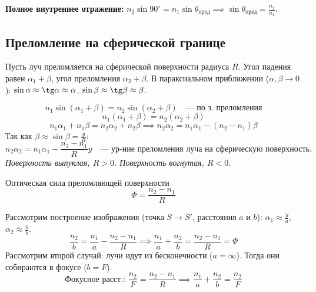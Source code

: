 \textbf{Полное внутреннее отражение:} 
$n_2 \sin 90^\circ = n_1 \sin\theta_{\text{пред}} \implies \sin\theta_{\text{пред}} = \frac{n_2}{n_1}$.

\subsection{Преломление на сферической границе}

Пусть луч преломляется на сферической поверхности радиуса $R$. Угол падения равен $\alpha_1 + \beta$, угол преломления $\alpha_2 + \beta$.
В параксиальном приближении ($\alpha, \beta \to 0$): $\sin\alpha \approx \tg\alpha \approx \alpha$, $\sin\beta \approx \tg\beta \approx \beta$.

\begin{equation*}
	n_1 \sin(\alpha_1 + \beta) = n_2 \sin(\alpha_2 + \beta) \quad \text{--- по з. преломления}
\end{equation*}
\begin{equation*}
	n_1(\alpha_1 + \beta) = n_2(\alpha_2 + \beta)
\end{equation*}
\begin{equation*}
	n_1 \alpha_1 + n_1 \beta = n_2 \alpha_2 + n_2 \beta \implies n_2 \alpha_2 = n_1 \alpha_1 - (n_2 - n_1)\beta
\end{equation*}
Так как $\beta \approx \sin\beta = \frac{y}{R}$:
\begin{equation}
	n_2 \alpha_2 = n_1 \alpha_1 - \frac{n_2 - n_1}{R} y \quad \text{--- ур-ние преломления луча на сферическую поверхность.}
\end{equation}
\textit{Поверхность выпуклая, $R > 0$. Поверхность вогнутая, $R < 0$.}

\begin{definition}{Оптическая сила преломляющей поверхности}{}
	\begin{equation*}
		\Phi = \frac{n_2 - n_1}{R}
	\end{equation*}
\end{definition}

Рассмотрим построение изображения (точка $S \to S'$, расстояния $a$ и $b$):
$\alpha_1 \approx \frac{y}{a}$, $\alpha_2 \approx \frac{y}{b}$.
\begin{equation*}
	\frac{n_2}{b} = \frac{n_1}{a} - \frac{n_2 - n_1}{R} \implies \frac{n_1}{a} + \frac{n_2}{b} = \frac{n_2 - n_1}{R} = \Phi
\end{equation*}
Рассмотрим второй случай: лучи идут из бесконечности ($a = \infty$). Тогда они собираются в фокусе ($b = F$).
\begin{equation*}
	\text{Фокусное расст.: } \frac{n_2}{F} = \frac{n_2 - n_1}{R} \implies \frac{n_1}{a} + \frac{n_2}{b} = \frac{n_2}{F}
\end{equation*}

